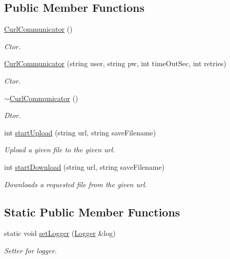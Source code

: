 \subsection*{Public Member Functions}
\begin{DoxyCompactItemize}
\item 
\hypertarget{classCurlCommunicator_a67f50f315cc1e99042637aa67dd14c03}{\hyperlink{classCurlCommunicator_a67f50f315cc1e99042637aa67dd14c03}{Curl\-Communicator} ()}\label{classCurlCommunicator_a67f50f315cc1e99042637aa67dd14c03}

\begin{DoxyCompactList}\small\item\em Ctor. \end{DoxyCompactList}\item 
\hyperlink{classCurlCommunicator_a54f8093da6f396f88015f000f96e537a}{Curl\-Communicator} (string user, string pw, int time\-Out\-Sec, int retries)
\begin{DoxyCompactList}\small\item\em Ctor. \end{DoxyCompactList}\item 
\hypertarget{classCurlCommunicator_ae6280940aaed63c9d8d4da2a930eb719}{\hyperlink{classCurlCommunicator_ae6280940aaed63c9d8d4da2a930eb719}{$\sim$\-Curl\-Communicator} ()}\label{classCurlCommunicator_ae6280940aaed63c9d8d4da2a930eb719}

\begin{DoxyCompactList}\small\item\em Dtor. \end{DoxyCompactList}\item 
int \hyperlink{classCurlCommunicator_a33dd04c8d5075d13cba92090f8482211}{start\-Upload} (string url, string save\-Filename)
\begin{DoxyCompactList}\small\item\em Upload a given file to the given url. \end{DoxyCompactList}\item 
int \hyperlink{classCurlCommunicator_a02e733609c88dbf00811b3d61d83abae}{start\-Download} (string url, string save\-Filename)
\begin{DoxyCompactList}\small\item\em Downloads a requested file from the given url. \end{DoxyCompactList}\end{DoxyCompactItemize}
\subsection*{Static Public Member Functions}
\begin{DoxyCompactItemize}
\item 
static void \hyperlink{classCurlCommunicator_a006af85c4b542cad443f5f96414e4765}{set\-Logger} (\hyperlink{classLogger}{Logger} \&log)
\begin{DoxyCompactList}\small\item\em Setter for logger. \end{DoxyCompactList}\end{DoxyCompactItemize}
